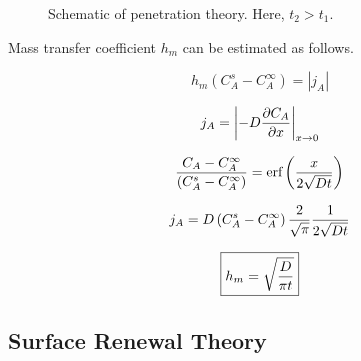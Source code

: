 \begin{figure}[h]
\begin{center}
\end{center}
\caption{Schematic of penetration theory. Here, $t_2 > t_1$.}
\label{penetrationtheory}
\end{figure}

Mass transfer coefficient $h_m$ can be estimated as follows.

$$ h_m \left( C_A^s - C_A^\infty \right) = \left| j_A \right| $$

$$ j_A = \left| -D {\partial C_A \over \partial x} \right|_{x \rightarrow 0} $$

$$ { C_A - C_A^\infty \over \left( C_A^s - C_A^\infty \right) } =  \text{erf} \left( {x \over 2 \sqrt{D t} } \right) $$

$$ j_A = D \left( C_A^s - C_A^\infty \right) {2 \over \sqrt{\pi}} {1 \over 2 \sqrt{Dt} } $$

\begin{equation}
\boxed{
	h_m = \sqrt {D \over \pi t}
}
\end{equation}


\subsection{Surface Renewal Theory}

